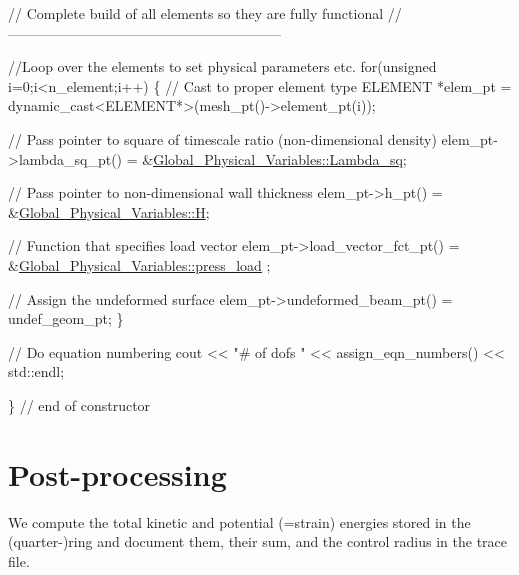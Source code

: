 \begin{DoxyCodeInclude}

 \textcolor{comment}{// Complete build of all elements so they are fully functional}
 \textcolor{comment}{// -----------------------------------------------------------}

 \textcolor{comment}{//Loop over the elements to set physical parameters etc.}
 \textcolor{keywordflow}{for}(\textcolor{keywordtype}{unsigned} i=0;i<n\_element;i++)
  \{
   \textcolor{comment}{// Cast to proper element type}
   ELEMENT *elem\_pt = \textcolor{keyword}{dynamic\_cast<}ELEMENT*\textcolor{keyword}{>}(mesh\_pt()->element\_pt(i));
   
   \textcolor{comment}{// Pass pointer to square of timescale ratio (non-dimensional density)}
   elem\_pt->lambda\_sq\_pt() = &\hyperlink{namespaceGlobal__Physical__Variables_a6fe17557ceb32dd353827fba60408363}{Global\_Physical\_Variables::Lambda\_sq};

   \textcolor{comment}{// Pass pointer to non-dimensional wall thickness}
   elem\_pt->h\_pt() = &\hyperlink{namespaceGlobal__Physical__Variables_af6e07423e22c0991084d9a2f43727805}{Global\_Physical\_Variables::H};

   \textcolor{comment}{// Function that specifies load vector}
   elem\_pt->load\_vector\_fct\_pt() = &\hyperlink{namespaceGlobal__Physical__Variables_a86fd8f502cb8c4c7939ffae742f023eb}{Global\_Physical\_Variables::press\_load}
      ;
   
   \textcolor{comment}{// Assign the undeformed surface}
   elem\_pt->undeformed\_beam\_pt() = undef\_geom\_pt;
  \}
 
 \textcolor{comment}{// Do equation numbering}
 cout << \textcolor{stringliteral}{"# of dofs "} << assign\_eqn\_numbers() << std::endl;
 
\} \textcolor{comment}{// end of constructor}

\end{DoxyCodeInclude}




 

\hypertarget{index_doc}{}\section{Post-\/processing}\label{index_doc}
We compute the total kinetic and potential (=strain) energies stored in the (quarter-\/)ring and document them, their sum, and the control radius in the trace file.


